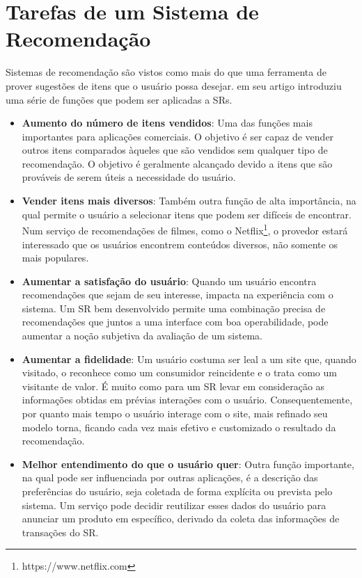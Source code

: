 \section{Tarefas de um Sistema de Recomendação}
\label{sec:tarefasSistemaRecomendacao}

Sistemas de recomendação são vistos como mais do que uma ferramenta de prover sugestões de itens que o usuário possa desejar. \citep{Ricci2011} em seu artigo introduziu uma série de funções que podem ser aplicadas a SRs.

\begin{itemize}
	\item{\textbf{Aumento do número de itens vendidos}: Uma das funções mais importantes para aplicações comerciais. O objetivo é ser capaz de vender outros itens comparados àqueles que são vendidos sem qualquer tipo de recomendação. O objetivo é geralmente alcançado devido a itens que são prováveis de serem úteis a necessidade do usuário.}

	\item{\textbf{Vender itens mais diversos}: Também outra função de alta importância, na qual permite o usuário a selecionar itens que podem ser difíceis de encontrar. Num serviço de recomendações de filmes, como o Netflix\footnote{https://www.netflix.com}, o provedor estará interessado que os usuários encontrem conteúdos diversos, não somente os mais populares.}

	\item{\textbf{Aumentar a satisfação do usuário}: Quando um usuário encontra recomendações que sejam de seu interesse, impacta na experiência com o sistema. Um SR bem desenvolvido permite uma combinação precisa de recomendações que juntos a uma interface com boa operabilidade, pode aumentar a noção subjetiva da avaliação de um sistema.}

	\item{\textbf{Aumentar a fidelidade}: Um usuário costuma ser leal a um site que, quando visitado, o reconhece como um consumidor reincidente e o trata como um visitante de valor. É muito como para um SR levar em consideração as informações obtidas em prévias interações com o usuário. Consequentemente, por quanto mais tempo o usuário interage com o site, mais refinado seu modelo torna, ficando cada vez mais efetivo e customizado o resultado da recomendação.}

	\item{\textbf{Melhor entendimento do que o usuário quer}: Outra função importante, na qual pode ser influenciada por outras aplicações, é a descrição das preferências do usuário, seja coletada de forma explícita ou prevista pelo sistema. Um serviço pode decidir reutilizar esses dados do usuário para anunciar um produto em específico, derivado da coleta das informações de transações do SR.}
\end{itemize}

